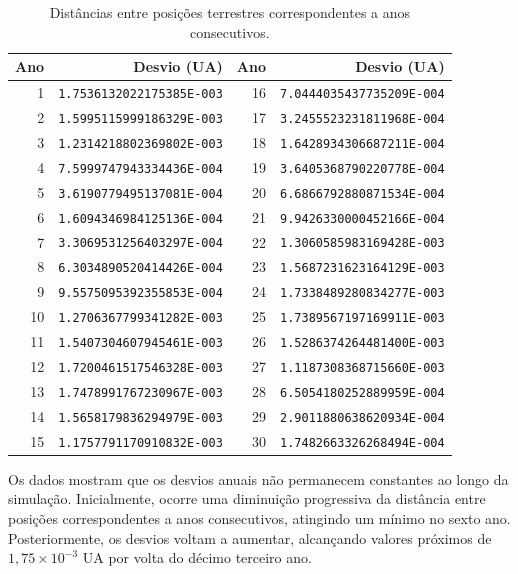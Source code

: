 \documentclass[12pt,a4paper]{article}
\begin{document}
\begin{table}[htbp]
    \centering
    \caption{Distâncias entre posições terrestres correspondentes a anos consecutivos.}
    \label{tab:desvios-anuais}
    \scriptsize
    \begin{tabular}{r r r r}
        \hline
        Ano & Desvio (UA) & Ano & Desvio (UA) \\
        \hline
        1  & \texttt{1.7536132022175385E-003} & 16 & \texttt{7.0444035437735209E-004} \\
        2  & \texttt{1.5995115999186329E-003} & 17 & \texttt{3.2455523231811968E-004} \\
        3  & \texttt{1.2314218802369802E-003} & 18 & \texttt{1.6428934306687211E-004} \\
        4  & \texttt{7.5999747943334436E-004} & 19 & \texttt{3.6405368790220778E-004} \\
        5  & \texttt{3.6190779495137081E-004} & 20 & \texttt{6.6866792880871534E-004} \\
        6  & \texttt{1.6094346984125136E-004} & 21 & \texttt{9.9426330000452166E-004} \\
        7  & \texttt{3.3069531256403297E-004} & 22 & \texttt{1.3060585983169428E-003} \\
        8  & \texttt{6.3034890520414426E-004} & 23 & \texttt{1.5687231623164129E-003} \\
        9  & \texttt{9.5575095392355853E-004} & 24 & \texttt{1.7338489280834277E-003} \\
        10 & \texttt{1.2706367799341282E-003} & 25 & \texttt{1.7389567197169911E-003} \\
        11 & \texttt{1.5407304607945461E-003} & 26 & \texttt{1.5286374264481400E-003} \\
        12 & \texttt{1.7200461517546328E-003} & 27 & \texttt{1.1187308368715660E-003} \\
        13 & \texttt{1.7478991767230967E-003} & 28 & \texttt{6.5054180252889959E-004} \\
        14 & \texttt{1.5658179836294979E-003} & 29 & \texttt{2.9011880638620934E-004} \\
        15 & \texttt{1.1757791170910832E-003} & 30 & \texttt{1.7482663326268494E-004} \\
        \hline
    \end{tabular}
\end{table}

Os dados mostram que os desvios anuais não permanecem constantes ao longo da simulação. Inicialmente, ocorre uma diminuição progressiva da distância entre posições correspondentes a anos consecutivos, atingindo um mínimo no sexto ano. Posteriormente, os desvios voltam a aumentar, alcançando valores próximos de $1,75\times10^{-3}$ UA por volta do décimo terceiro ano.
\end{document}
